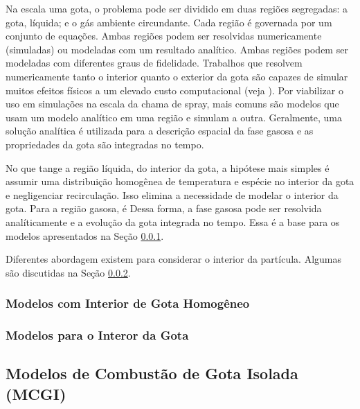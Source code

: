 
Na escala uma gota, o problema pode ser dividido em duas regiões segregadas: a gota, líquida; e o gás ambiente circundante. 
Cada região é governada por um conjunto de equações.
Ambas regiões podem ser resolvidas numericamente (simuladas) ou modeladas com um resultado analítico.
Ambas regiões podem ser modeladas com diferentes graus de fidelidade.
Trabalhos que resolvem numericamente tanto o interior quanto o exterior da gota são capazes de simular muitos efeitos físicos a um elevado custo computacional (veja ).
Por viabilizar o uso em simulações na escala da chama de spray, mais comuns são modelos que usam um modelo analítico em uma região e simulam a outra.
Geralmente, uma solução analítica é utilizada para a descrição espacial da fase gasosa e as propriedades da gota são integradas no tempo. 

No que tange a região líquida, do interior da gota, a hipótese mais simples é assumir uma distribuição homogênea de temperatura e espécie no interior da gota e negligenciar recirculação.
Isso elimina a necessidade de modelar o interior da gota.
Para a região gasosa, é 
Dessa forma, a fase gasosa pode ser resolvida analíticamente e a evolução da gota integrada no tempo.
Essa é a base para os modelos apresentados na Seção \ref{sec:RMM}.

Diferentes abordagem existem para considerar o interior da partícula.
Algumas são discutidas na Seção \ref{sec:int}.


\subsubsection{Modelos com Interior de Gota Homogêneo} \label{sec:RMM}


% 






\subsubsection{Modelos para o Interor da Gota} \label{sec:int}


\subsection{Modelos de Combustão de Gota Isolada (MCGI)} \label{sec:MCGI}

